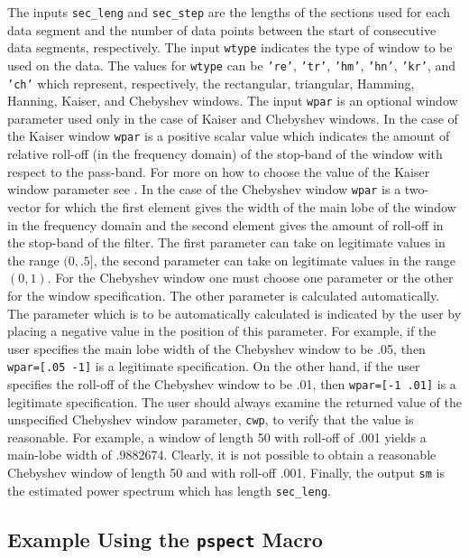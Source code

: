 	The inputs {\tt sec\_leng} and {\tt sec\_step}
are the lengths of the sections used for each data segment and the 
number of data points between the start of consecutive data segments,
respectively.  The input {\tt wtype} indicates the type of window 
to be used on the data.  The values for {\tt wtype} can be
{\tt 're'}, {\tt 'tr'}, {\tt 'hm'}, {\tt 'hn'}, {\tt 'kr'}, and {\tt 'ch'}
which represent, respectively, the rectangular, triangular, Hamming,
Hanning, Kaiser, and Chebyshev windows.  The input {\tt wpar} is
an optional window parameter used only in the case of Kaiser and
Chebyshev windows.  In the case of the Kaiser window {\tt wpar} is
a positive scalar value which indicates the amount of relative roll-off 
(in the frequency domain)
of the stop-band of the window with respect to the pass-band.  
For more on how to choose the value of the Kaiser window parameter
see \cite{rabiner}.
In the case of the Chebyshev window
{\tt wpar} is a two-vector for which the first element gives the
width of the main lobe of the window in the frequency domain and the 
second element gives the amount of roll-off in the stop-band
of the filter.  
The first parameter can take on legitimate values in the range $(0,.5]$,
the second parameter can take on legitimate values in the range $(0,1)$.
For the Chebyshev window one must choose one parameter
or the other for the window specification.  The other parameter is 
calculated automatically.  The parameter which is to be automatically
calculated is indicated by the user by placing a negative value in the position
of this parameter.  For example, if the user specifies the main lobe
width of the Chebyshev window to be .05, then {\tt wpar=[.05 -1]} is
a legitimate specification.  On the other hand, if the user specifies
the roll-off of the Chebyshev window to be .01, then {\tt wpar=[-1 .01]}
is a legitimate specification.  The user should always examine the returned
value of the unspecified Chebyshev window parameter, {\tt cwp}, to verify that
the value is reasonable.  For example, a window of length 50 with roll-off
of .001 yields a main-lobe width of .9882674.  Clearly, it is not possible
to obtain a reasonable Chebyshev window of length 50 and with roll-off
.001.  Finally, the output {\tt sm} is the estimated power spectrum
which has length {\tt sec\_leng}.

\subsection{Example Using the {\tt pspect} Macro}

